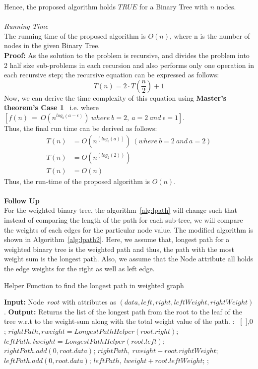 \documentclass{article}
\begin{document}
Hence, the proposed algorithm holds $TRUE$ for a Binary Tree with $n$ nodes.\\\\
\textit{Running Time}\\
The running time of the proposed algorithm is $O(n)$, where n is the number of nodes in the given Binary Tree.\\
\textbf{Proof:} As the solution to the problem is recursive, and divides the problem into 2 half size sub-problems in each recursion and also performs only one operation in each recursive step; the recursive equation can be expressed as follows:
\begin{equation*}
    T(n) = 2\cdot T(\frac{n}{2}) + 1
\end{equation*}
Now, we can derive the time complexity of this equation using \textbf{Master's theorem's Case 1}~\cite{cormen1990introduction} i.e. where $[f(n)\ =\ O(n^{log_b(a-\epsilon)})\ where\ b=2,\ a=2\ and\ \epsilon=1]$.\\ Thus, the final run time can be derived as follows:
\begin{align*}
    T(n) & = O(n^{(log_b(a))})\ (where\ b = 2\ and\ a = 2)\\
    T(n) & = O(n^{(log_2(2))})\\
    T(n) & = O(n)
\end{align*}
Thus, the run-time of the proposed algorithm is $O(n)$.\\\\
\textbf{Follow Up}\\
For the weighted binary tree, the algorithm~\ref{alg:lpath} will change such that instead of comparing the length of the path for each sub-tree, we will compare the weights of each edges for the particular node value. The modified algorithm is shown in Algorithm~\ref{alg:lpath2}. Here, we assume that, longest path for a weighted binary tree is the weighted path and thus, the path with the most weight sum is the longest path. Also, we assume that the Node attribute all holds the edge weights for the right as well as left edge.
\begin{algorithm}
\caption{Helper Function to find the longest path in weighted graph}
\label{alg:lpath2}
\begin{algorithmic}[1]
\State \textbf{Input:} Node\ $root$ with attributes as $(data, left, right, leftWeight, rightWeight)$.
\State \textbf{Output:} Returns the list of the longest path from the root to the leaf of the tree w.r.t to the weight-sum along with the total weight value of the path.
:
\State \Return\ [\ ],0 ;
\EndIf
\State $rightPath,rweight = LongestPathHelper(root.right)$;
\State $leftPath,lweight = LongestPathHelper(root.left)$;
\State $rightPath.add(0, root.data)$; 
\State \Return $rightPath,\ rweight+root.rightWeight$;
\Else
\State $leftPath.add(0, root.data)$; 
\State \Return $leftPath,\ lweight + root.leftWeight$; 
\EndIf
\State \Return;
\EndFunction
\end{algorithmic}
\end{algorithm}
\clearpage
\end{document}
